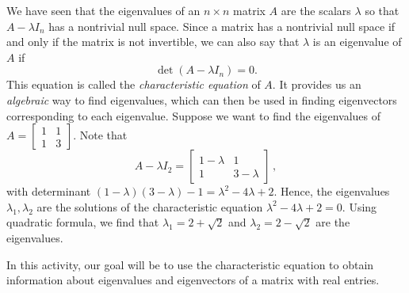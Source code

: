 We have seen that the eigenvalues of an $n \times n$ matrix $A$ are the scalars $\lambda$ so that $A - \lambda I_n$ has a nontrivial null space. Since a matrix has a nontrivial null space if and only if the matrix is not invertible, we can also say that $\lambda$ is an eigenvalue of $A$ if
\begin{equation}
\det(A - \lambda I_n) = 0. \label{eq:PA5.2_1}
\end{equation}
This equation is called the \emph{characteristic equation} of $A$. It provides us an \emph{algebraic} way to find eigenvalues, which can then be used in finding eigenvectors corresponding to each eigenvalue. Suppose we want to find the eigenvalues of $A=\left[ \begin{array}{cc} 1 & 1 \\ 1& 3 \end{array} \right]$. Note that 
\[ A- \lambda I_2 = \left[ \begin{array}{cc} 1-\lambda & 1 \\ 1& 3-\lambda \end{array} \right]\, ,\]
with determinant $(1-\lambda)(3-\lambda)-1=\lambda^2-4\lambda+2$. Hence, the eigenvalues $\lambda_1, \lambda_2$ are the solutions of the characteristic equation $\lambda^2-4\lambda+2=0$. Using quadratic formula, we find that $\lambda_1=2+\sqrt{2}$ and $\lambda_2=2-\sqrt{2}$ are the eigenvalues.

In this activity, our goal will be to use the characteristic equation to obtain information about eigenvalues and eigenvectors of a matrix with real entries.

